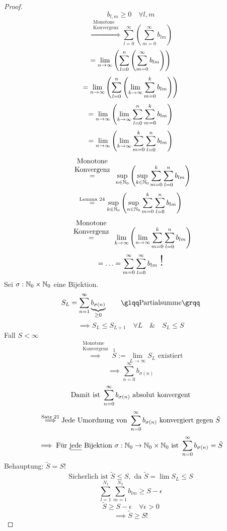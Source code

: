\begin{proof}

\[b_{l,m} \geq 0 \quad \forall l,m\]
\[\stackrel{\begin{array}{c}\text{Monotone}\\\text{Konvergenz}\end{array}}{\Longrightarrow} \sum_{l=0}^\infty  \left( \sum_{m=0}^\infty b_{lm} \right) \]
\[=\limN \left( \sum_{l=0}^n \left( \sum_{m=0}^\infty b_{lm} \right) \right)\]
\[=\limN \left( \sum_{l=0}^n \left( \limN[k] \sum_{m=0}^k b_{lm} \right) \right)\]
\[=\limN \left( \limN[k] \sum_{l=0}^n \sum_{m=0}^k b_{lm} \right)\]
\[=\limN \left( \limN[k] \sum_{m=0}^k \sum_{l=0}^n b_{lm} \right)\]
\[\stackrel{\begin{array}{c}\text{Monotone}\\\text{Konvergenz}\end{array}}{=}\sup_{n \in \N_0} \left( \sup_{k \in \N_0} \sum_{m=0}^k \sum_{l=0}^n b_{lm} \right)\]
\[\stackrel{\text{Lemma 24}}{=}\sup_{k \in \N_0} \left( \sup_{n \in \N_0} \sum_{m=0}^k \sum_{l=0}^n b_{lm} \right)\]
\[\stackrel{\begin{array}{c}\text{Monotone}\\\text{Konvergenz}\end{array}}{=}\limN[k] \left( \limN[n] \sum_{m=0}^k \sum_{l=0}^n b_{lm} \right)\]
\[=\ldots=\sum_{m=0}^\infty \sum_{l=0}^\infty b_{lm} \text{ \huge !}\]
Sei $\sigma: \N_0 \times \N_0$ eine Bijektion.
\[S_L = \sum_{n=1}^\infty \underbrace{b_{\sigma(n)}}_{\geq 0} \qquad  \text{\qq{Partialsumme}}\]
\[\implies S_L \leq S_{L+1} \quad \forall L \quad \& \quad \boxed{S_L \leq S}\]
Fall $ S < \infty $
\[\stackrel{\begin{array}{c}\text{Monotone}\\\text{Konvergenz}\end{array}}{\implies}\stackrel{1}{S} := \lim_{L \to \infty} S_L \text{ existiert}\]
\[\implies \sum_{n=0}^\infty b_{\sigma(n)}\]
\[\text{Damit ist } \sumNI b_{\sigma(n)} \text{ absolut konvergent}\]
\[\stackrel{\text{Satz 21}}{\implies} \text{Jede Umordnung von } \sumNI b_{\sigma(n)} \text{ konvergiert gegen } \tilde{S}\]
\[\implies \text{Für \underline{jede} Bijektion } \sigma: \N_0 \to \N_0 \times \N_0 \text{ ist } \sumNI b_{\sigma(n)} = \tilde{S}\]
Behauptung: $\tilde{S} = S$!
\[\text{Sicherlich ist } \tilde{S} \leq S, \text{ da } \tilde{S}= \lim S_L \leq S\]
\[\sum_{l=1}^{N_1} \sum_{m=1}^{N_2} b_{lm} \geq S-\epsilon\]
\[\tilde{S} \geq S-\epsilon \quad \forall \epsilon > 0\]
\[\implies \tilde{S} \geq S !\]

\end{proof}


